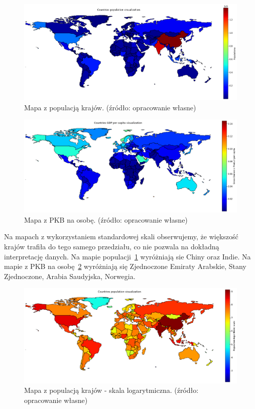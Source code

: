 \documentclass[11pt]{report}
\begin{document}
    \begin{figure}[!htp]
        \centering
        \includegraphics[width=\linewidth]{fig/CLUST/population.png}
        \caption{Mapa z populacją krajów. (źródło: opracowanie własne)}
        \label{fig:clustPop}
    \end{figure}

    \begin{figure}[!htp]
        \centering
        \includegraphics[width=\linewidth]{fig/CLUST/gdp.png}
        \caption{Mapa z PKB na osobę. (źródło: opracowanie własne)}
        \label{fig:clustGDP}
    \end{figure}

    Na mapach z wykorzystaniem standardowej skali obserwujemy, że większość krajów trafiła do tego samego przedziału, co nie pozwala na dokładną interpretację danych.
    Na mapie populacji~\ref{fig:clustPop} wyróżniają sie Chiny oraz Indie.
    Na mapie z PKB na osobę~\ref{fig:clustGDP} wyróżniają się Zjednoczone Emiraty Arabskie, Stany Zjednoczone, Arabia Saudyjska, Norwegia.

    \begin{figure}[!htp]
        \centering
        \includegraphics[width=\linewidth]{fig/CLUST/population_log.png}
        \caption{Mapa z populacją krajów - skala logarytmiczna. (źródło: opracowanie własne)}
        \label{fig:clustPop_log}
    \end{figure}
\end{document}
